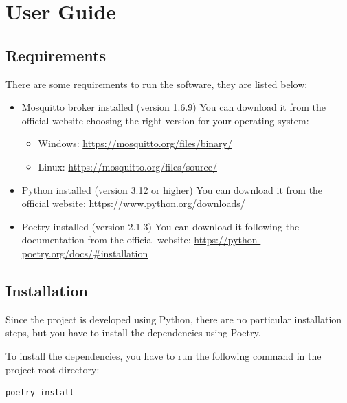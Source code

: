 \documentclass{scrartcl}
\begin{document}
\newpage
\section{User Guide}\label{user-guide}
\subsection{Requirements}\label{user-guide-requirements}
There are some requirements to run the software, they are listed below:
\begin{itemize}
      \item Mosquitto broker installed (version 1.6.9)
            You can download it from the official website choosing the right version for your operating system: 
            \begin{itemize}
                  \item Windows: \url{https://mosquitto.org/files/binary/} 
                  \item Linux: \url{https://mosquitto.org/files/source/}
            \end{itemize}  
      \item Python installed (version 3.12 or higher)
            You can download it from the official website: \url{https://www.python.org/downloads/}
      \item Poetry installed (version 2.1.3)
            You can download it following the documentation from the official website: 
            \url{https://python-poetry.org/docs/#installation}
\end{itemize}

\subsection{Installation}\label{installation}
Since the project is developed using Python, there are no particular installation steps, but you 
have to install the dependencies using Poetry.

To install the dependencies, you have to run the following command in the project root directory:
\begin{verbatim}
poetry install
\end{verbatim}
\end{document}
